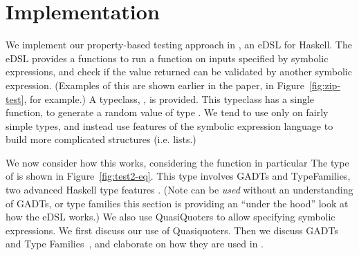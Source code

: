 \section{Implementation}

We implement our property-based testing approach
in \ourDSL, an eDSL for Haskell.
The eDSL provides a functions 
to run a function
on inputs specified by symbolic expressions,
and check if the value returned can be validated by another symbolic expression.
(Examples of this are shown earlier in the
paper, in Figure~\ref{fig:zip-test}, for example.)
A typeclass, , is provided.
This typeclass has a single function, 
to generate a random value of type .
We tend to use  only on
fairly simple types,
and instead use features of the symbolic expression language to build
more complicated structures (i.e. lists.)

We now consider how this works,
 considering the  function in particular
The type of  is shown in Figure~\ref{fig:test2-eq}.
This type involves GADTs and TypeFamilies,
two advanced Haskell type features .
(Note \ourDSL can be \textit{used} without an understanding of GADTs, or type families
this section is providing an ``under the hood'' look at how the eDSL works.)
We also use QuasiQuoters to allow specifying symbolic expressions.
We first discuss our use of Quasiquoters.
Then we discuss
GADTs and Type Families~\cite{sulzmann2007system},
and elaborate on how they are used in \ourDSL.

















